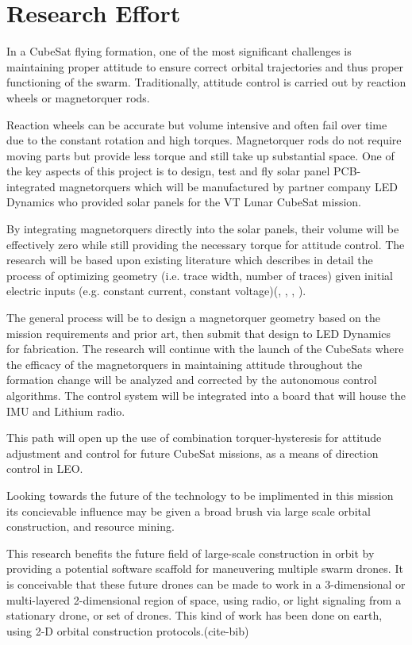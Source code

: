 \section{Research Effort}

In a CubeSat flying formation, one of the most significant challenges
is maintaining proper attitude to ensure correct orbital trajectories
and thus proper functioning of the swarm. Traditionally, attitude
control is carried out by reaction wheels or magnetorquer
rods.

Reaction wheels can be accurate but volume intensive and often
fail over time due to the constant rotation and high
torques. Magnetorquer rods do not require moving parts but provide
less torque and still take up substantial space. One of the key
aspects of this project is to design, test and fly solar panel
PCB-integrated magnetorquers which will be manufactured by partner
company LED Dynamics who provided solar panels for the VT Lunar
CubeSat mission.

By integrating magnetorquers directly into the solar panels, their
volume will be effectively zero while still providing the necessary
torque for attitude control. The research will be based upon existing
literature which describes in detail the process of optimizing
geometry (i.e. trace width, number of traces) given initial electric
inputs (e.g. constant current, constant voltage)(\cite{ali:2021}, \cite{khan:2022}, \cite{sokal:2019}, \cite{sorensen:2021}).

 The general process will be to design a magnetorquer
geometry based on the mission requirements and prior art, then submit
that design to LED Dynamics for fabrication. The research will
continue with the launch of the CubeSats where the efficacy of the
magnetorquers in maintaining attitude throughout the formation change
will be analyzed and corrected by the autonomous control
algorithms. The control system will be integrated into a board that
will house the IMU and Lithium radio.

This path will open up the use of combination torquer-hysteresis for
attitude adjustment and control for future CubeSat missions, as a
means of direction control in LEO.

Looking towards the future of the technology to be implimented in this mission
its concievable influence may be given a broad brush via large scale orbital construction,
and resource mining.

This research benefits the future field of large-scale construction in
orbit by providing a potential software scaffold for maneuvering multiple swarm
drones. It is conceivable that these future drones can be made to work
in a 3-dimensional or multi-layered 2-dimensional region of space,
using radio, or light signaling from a stationary drone, or set of
drones. This kind of work has been done on earth, using 2-D orbital
construction protocols.(cite-bib)

